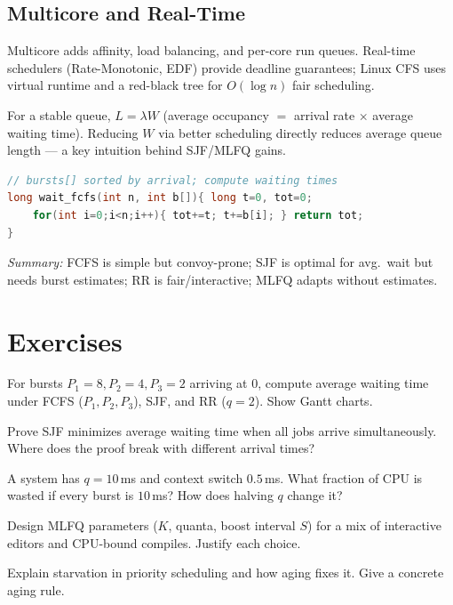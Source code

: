 \subsection{Multicore and Real-Time}
Multicore adds affinity, load balancing, and per-core run queues. Real-time
schedulers (Rate-Monotonic, EDF) provide deadline guarantees; Linux CFS uses
virtual runtime and a red-black tree for $O(\log n)$ fair scheduling.

\begin{remark}
For a stable queue, $L = \lambda W$ (average occupancy $=$ arrival rate
$\times$ average waiting time). Reducing $W$ via better scheduling directly
reduces average queue length --- a key intuition behind SJF/MLFQ gains.
\end{remark}

\begin{lstlisting}[language=C,caption={Simulating FCFS vs.\ SJF (sketch)}]
// bursts[] sorted by arrival; compute waiting times
long wait_fcfs(int n, int b[]){ long t=0, tot=0;
    for(int i=0;i<n;i++){ tot+=t; t+=b[i]; } return tot;
}
\end{lstlisting}

\begin{center}
\small\textit{Summary:} FCFS is simple but convoy-prone; SJF is optimal for avg.\ wait
but needs burst estimates; RR is fair/interactive; MLFQ adapts without estimates.
\end{center}

\section{Exercises}
\label{sec:ch03-ex}
\begin{exercise}
For bursts $P_1{=}8, P_2{=}4, P_3{=}2$ arriving at $0$, compute average waiting
time under FCFS ($P_1,P_2,P_3$), SJF, and RR ($q=2$). Show Gantt charts.
\end{exercise}
\begin{exercise}
Prove SJF minimizes average waiting time when all jobs arrive simultaneously.
Where does the proof break with different arrival times?
\end{exercise}
\begin{exercise}
A system has $q=10$\,ms and context switch $0.5$\,ms. What fraction of CPU is
wasted if every burst is $10$\,ms? How does halving $q$ change it?
\end{exercise}
\begin{exercise}
Design MLFQ parameters ($K$, quanta, boost interval $S$) for a mix of
interactive editors and CPU-bound compiles. Justify each choice.
\end{exercise}
\begin{exercise}
Explain starvation in priority scheduling and how aging fixes it. Give a
concrete aging rule.
\end{exercise}
